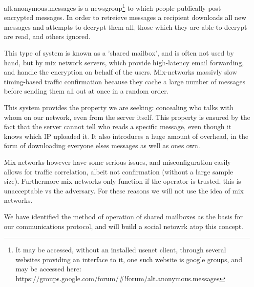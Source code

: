 alt.anonymous.messages is a newsgroup\footnote{It may be accessed, without an
installed usenet client, through several websites providing an interface to it,
one such website is google groups, and may be accessed here:
https://groups.google.com/forum/\#!forum/alt.anonymous.messages} to which people
publically post encrypted messages. In order to retreieve messages a recipient
downloads all new messages and attempts to decrypt them all, those which they
are able to decrypt are read, and others ignored.

This type of system is known as a 'shared mailbox', and is often not used by
hand, but by mix network servers, which provide high-latency email forwarding,
and handle the encryption on behalf of the users. Mix-networks massivly slow
timing-based traffic confirmation because they cache a large number of messages
before sending them all out at once in a random order\cite{mixnetOperation}.

This system provides the property we are seeking: concealing who talks with whom
on our network, even from the server itself. This property is ensured by the
fact that the server cannot tell who reads a specific message, even though it
knows which IP uploaded it. It also introduces a huge amount of overhead, in the
form of downloading everyone elses messages as well as ones own.

Mix networks however have some serious issues, and misconfiguration easily
allows for traffic correlation\cite{mixnet}, albeit not confirmation (without a
large sample size). Furthermore mix networks only function if the operator is
trusted, this is unacceptable vs the adversary. For these reasons we will not
use the idea of mix networks.

We have identified the method of operation of shared mailboxes as the basis for
our communications protocol, and will build a social netowrk atop this concept.
